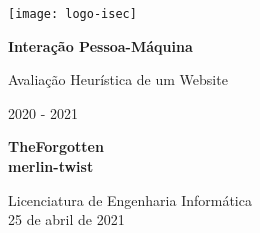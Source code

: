 \begin{titlepage}
	\begin{center}
		\texttt{[image: logo-isec]}
		
		\vspace*{\fill}
		
		\Huge
		\textbf{Interação Pessoa-Máquina}
		
		\huge
		Avaliação Heurística de um Website
		
		\vspace{0.5cm}
		\LARGE
		2020 - 2021
		
		\vspace{1.5cm}
		
		\textbf{TheForgotten\\merlin-twist}
		
		\vfill
		\vspace*{\fill}
		
		\normalsize
		Licenciatura de Engenharia Informática \\
		25 de abril de 2021		
	\end{center}
\end{titlepage}
